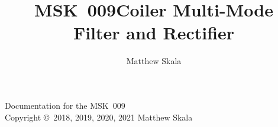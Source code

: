 \documentclass{ncmanual}
\title{MSK~009\quad Coiler Multi-Mode\\Filter and Rectifier}
\author{Matthew Skala}
\begin{document}
\maketitle


\begin{copyrightpage}
Documentation for the MSK~009\\
Copyright \copyright\ 2018, 2019, 2020, 2021 Matthew Skala

\GPLThreeStatement
\end{copyrightpage}

\tableofcontents


\texdependspdfworkaround











\end{document}
